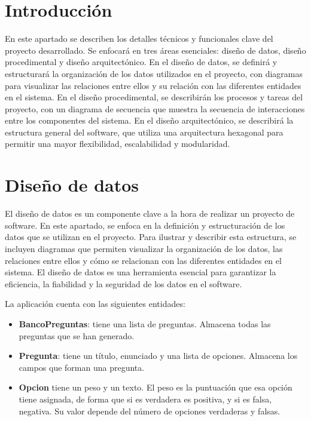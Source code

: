 
\section{Introducción}

En este apartado se describen los detalles técnicos y funcionales clave del proyecto desarrollado. Se enfocará en tres áreas esenciales: diseño de datos, diseño procedimental y diseño arquitectónico. En el diseño de datos, se definirá y estructurará la organización de los datos utilizados en el proyecto, con diagramas para visualizar las relaciones entre ellos y su relación con las diferentes entidades en el sistema. En el diseño procedimental, se describirán los procesos y tareas del proyecto, con un diagrama de secuencia que muestra la secuencia de interacciones entre los componentes del sistema. En el diseño arquitectónico, se describirá la estructura general del software, que utiliza una arquitectura hexagonal para permitir una mayor flexibilidad, escalabilidad y modularidad.

\section{Diseño de datos}

El diseño de datos es un componente clave a la hora de realizar un proyecto de software. En este apartado, se enfoca en la definición y estructuración de los datos que se utilizan en el proyecto. Para ilustrar y describir esta estructura, se incluyen diagramas que permiten visualizar la organización de los datos, las relaciones entre ellos y cómo se relacionan con las diferentes entidades en el sistema. El diseño de datos es una herramienta esencial para garantizar la eficiencia, la fiabilidad y la seguridad de los datos en el software. \cite{wiki:diseñodatos}

La aplicación cuenta con las siguientes entidades:
\begin{itemize}
    \item \textbf{BancoPreguntas}: tiene una lista de preguntas. Almacena todas las preguntas que se han generado.
    \item \textbf{Pregunta}: tiene un título, enunciado y una lista de opciones. Almacena los campos que forman una pregunta.
    \item \textbf{Opcion} tiene un peso y un texto. El peso es la puntuación que esa opción tiene asignada, de forma que si es verdadera es positiva, y si es falsa, negativa. Su valor depende del número de opciones verdaderas y falsas.
\end{itemize}

